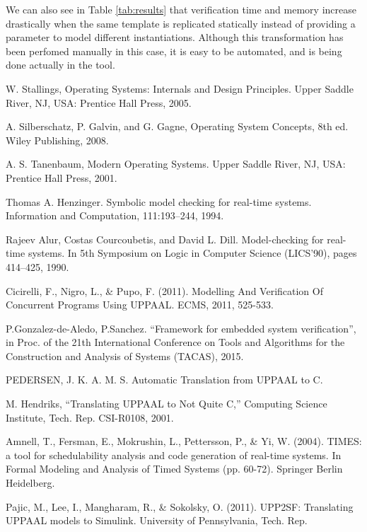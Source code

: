 \documentclass[conference]{IEEEtran}
\begin{document}
We can also see in Table \ref{tab:results} that verification time and memory increase drastically when the same template is replicated statically instead  of providing a parameter to model different instantiations. Although this transformation has been perfomed manually in this case, it is easy to be automated, and is being done actually in the tool.

\begin{thebibliography}{1}

W. Stallings, Operating Systems: Internals and Design Principles.
Upper Saddle River, NJ, USA: Prentice Hall Press, 2005.

A. Silberschatz, P. Galvin, and G. Gagne, Operating System Concepts,
8th ed. Wiley Publishing, 2008.

A. S. Tanenbaum, Modern Operating Systems. Upper Saddle River,
NJ, USA: Prentice Hall Press, 2001.

Thomas A. Henzinger. Symbolic model checking for real-time systems. Information
and Computation, 111:193–244, 1994.

Rajeev Alur, Costas Courcoubetis, and David L. Dill. Model-checking for real-
time systems. In 5th Symposium on Logic in Computer Science (LICS'90), pages 414–425, 1990.

Cicirelli, F., Nigro, L., \& Pupo, F. (2011). Modelling And Verification Of Concurrent Programs Using UPPAAL. ECMS, 2011, 525-533.

P.Gonzalez-de-Aledo, P.Sanchez. ``Framework for embedded system verification'', in Proc. of the 21th International Conference on Tools and Algorithms for the Construction and Analysis of Systems (TACAS), 2015.

PEDERSEN, J. K. A. M. S. Automatic Translation from UPPAAL to C.

M. Hendriks, “Translating UPPAAL to Not Quite C,” Computing Science Institute, Tech. Rep. CSI-R0108, 2001.


Amnell, T., Fersman, E., Mokrushin, L., Pettersson, P., \& Yi, W. (2004). TIMES: a tool for schedulability analysis and code generation of real-time systems. In Formal Modeling and Analysis of Timed Systems (pp. 60-72). Springer Berlin Heidelberg.


Pajic, M., Lee, I., Mangharam, R., \& Sokolsky, O. (2011). UPP2SF: Translating UPPAAL models to Simulink. University of Pennsylvania, Tech. Rep.



\end{thebibliography}
\end{document}
